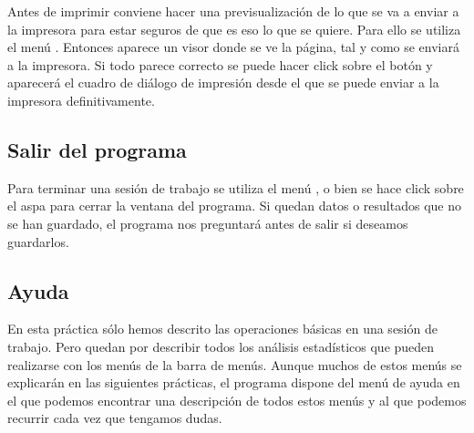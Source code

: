 Antes de imprimir conviene hacer una previsualización de lo que se va a enviar a la impresora para estar seguros de que es eso lo que se
quiere. Para ello se utiliza el menú . Entonces aparece un visor donde se ve la página, tal y como
se enviará a la impresora. Si todo parece correcto se puede hacer click sobre el botón  y aparecerá el cuadro de diálogo de
impresión desde el que se puede enviar a la impresora definitivamente.

\subsection{Salir del programa}
Para terminar una sesión de trabajo se utiliza el menú , o bien se hace click sobre el aspa para cerrar la ventana del programa. Si quedan datos o resultados que no se han guardado, el programa nos preguntará antes de salir si deseamos guardarlos.

\subsection{Ayuda}
En esta práctica sólo hemos descrito las operaciones básicas en una sesión de trabajo. Pero quedan por describir todos los análisis estadísticos que pueden realizarse con los menús de la barra de menús. Aunque muchos de estos menús se explicarán en las siguientes prácticas, el programa dispone del menú de ayuda  en el que podemos encontrar una descripción de todos estos menús y al que podemos recurrir cada vez que tengamos dudas.

\clearpage
\newpage

